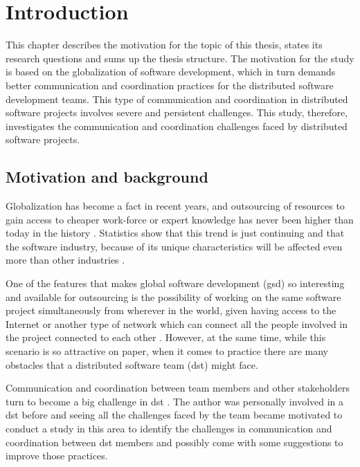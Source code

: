 \chapter{Introduction}
This chapter describes the motivation for the topic of this thesis, states its research questions and sums up the thesis structure. The motivation for the study is based on the globalization of software development, which in turn demands better communication and coordination practices for the distributed software development teams. This type of communication and coordination in distributed software projects involves severe and persistent challenges. This study, therefore, investigates the communication and coordination challenges faced by distributed software projects.


\section{Motivation and background}
Globalization has become a fact in recent years, and outsourcing of resources to gain access to cheaper work-force or expert knowledge has never been higher than today in the history \citep{MadonShirinandKrishna2017}. Statistics show that this trend is just continuing and that the software industry, because of its unique characteristics will be affected even more than other industries \citep{Sarfraz2016}. 

One of the features that makes global software development (\ac{gsd}) so interesting and available for outsourcing is the possibility of working on the same software project simultaneously from wherever in the world, given having access to the Internet or another type of network which can connect all the people involved in the project connected to each other \citep{Ferguson2004}. However, at the same time, while this scenario is so attractive on paper, when it comes to practice there are many obstacles that a distributed software team (\ac{dst}) might face. 

Communication and coordination between team members and other stakeholders turn to become a big challenge in \ac{dst} \citep{Casey2005}. The author was personally involved in a \ac{dst} before and seeing all the challenges faced by the team became motivated to conduct a study in this area to identify the challenges in communication and coordination between \ac{dst} members and possibly come with some suggestions to improve those practices.


